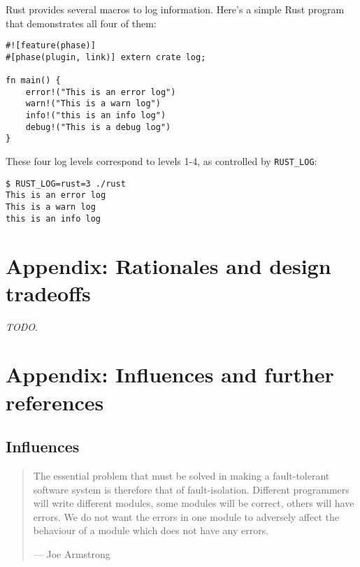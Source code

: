 \documentclass[]{article}
\begin{document}

Rust provides several macros to log information. Here's a simple Rust
program that demonstrates all four of them:

\begin{verbatim}
#![feature(phase)]
#[phase(plugin, link)] extern crate log;

fn main() {
    error!("This is an error log")
    warn!("This is a warn log")
    info!("this is an info log")
    debug!("This is a debug log")
}
\end{verbatim}

These four log levels correspond to levels 1-4, as controlled by
\texttt{RUST\_LOG}:

\begin{verbatim}
$ RUST_LOG=rust=3 ./rust
This is an error log
This is a warn log
this is an info log
\end{verbatim}

\section{Appendix: Rationales and design
tradeoffs}\label{appendix-rationales-and-design-tradeoffs}

\emph{TODO}.

\section{Appendix: Influences and further
references}\label{appendix-influences-and-further-references}

\subsection{Influences}\label{influences}

\begin{quote}
The essential problem that must be solved in making a fault-tolerant
software system is therefore that of fault-isolation. Different
programmers will write different modules, some modules will be correct,
others will have errors. We do not want the errors in one module to
adversely affect the behaviour of a module which does not have any
errors.

--- Joe Armstrong
\end{quote}
\end{document}
